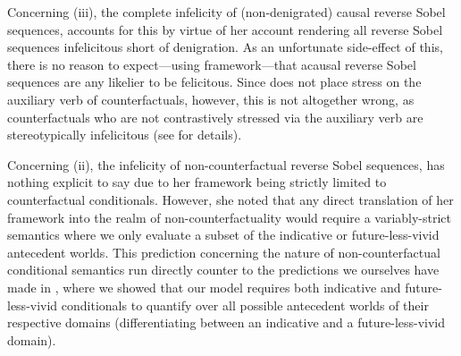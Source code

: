 Concerning (iii), the complete infelicity of (non-denigrated) causal reverse Sobel sequences, \textcite{Ippolito2020} accounts for this by virtue of her account rendering all reverse Sobel sequences infelicitous short of denigration. As an unfortunate side-effect of this, there is no reason to expect---using  framework---that acausal reverse Sobel sequences are any likelier to be felicitous. Since \textcite{Ippolito2020} does not place stress on the auxiliary verb of counterfactuals, however, this is not altogether wrong, as counterfactuals who are not contrastively stressed via the auxiliary verb are stereotypically infelicitous (see  for details).

Concerning (ii), the infelicity of non-counterfactual reverse Sobel sequences, \textcite{Ippolito2020} has nothing explicit to say due to her framework being strictly limited to counterfactual conditionals. However, she noted that any direct translation of her framework into the realm of non-counterfactuality would require a variably-strict semantics where we only evaluate a subset of the indicative or future-less-vivid antecedent worlds. This prediction concerning the nature of non-counterfactual conditional semantics run directly counter to the predictions we ourselves have made in , where we showed that our model requires both indicative and future-less-vivid conditionals to quantify over all possible antecedent worlds of their respective domains (differentiating between an indicative and a future-less-vivid domain).

